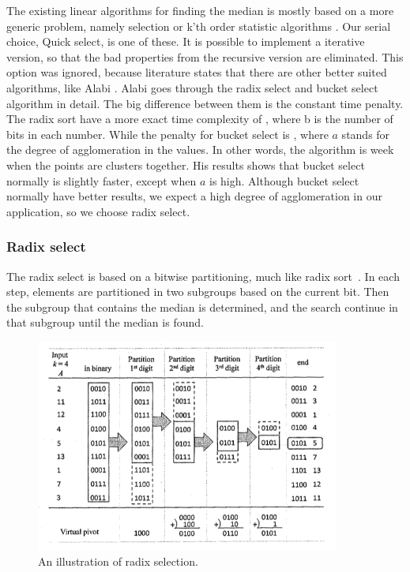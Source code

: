 The existing linear algorithms for finding the median is mostly based on a more generic problem, namely selection or k'th order statistic algorithms \citep[Chapter 9]{Cormen:2001}. Our serial choice, Quick select, is one of these. It is possible to implement a iterative version, so that the bad properties from the recursive version are eliminated. This option was ignored, because literature states that there are other better suited algorithms, like Alabi \citep{Alabi:2012}. Alabi goes through the radix select and bucket select algorithm in detail. The big difference between them is the constant time penalty. The radix sort have a more exact time complexity of , where b is the number of bits in each number. While the penalty for bucket select is , where $a$ stands for the degree of agglomeration in the values. In other words, the algorithm is week when the points are clusters together. His results shows that bucket select normally is slightly faster, except when $a$ is high. Although bucket select normally have better results, we expect a high degree of agglomeration in our application, so we choose radix select.


\subsubsection{Radix select} %
\label{ssub:radix_select}


The radix select is based on a bitwise partitioning, much like radix sort~\cite[Chapter 8.3]{Cormen:2001}. In each step, elements are partitioned in two subgroups based on the current bit. Then the subgroup that contains the median is determined, and the search continue in that subgroup until the median is found.

\begin{figure}[ht!]
\centering
\includegraphics[width=100mm]{../gfx/Radix_select.png}

\caption{An illustration of radix selection\cite{cayman:2012}.}
\label{fig:radix_select}
\end{figure}

